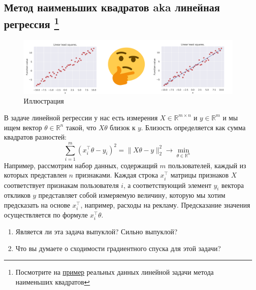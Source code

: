 \documentclass[
  russian,
  letterpaper,
  DIV=11,
  numbers=noendperiod]{scrartcl}
\providecommand{\tightlist}{%
  \setlength{\itemsep}{0pt}\setlength{\parskip}{0pt}}
\begin{document}
\subsection[Метод наименьших квадратов aka линейная регрессия
]{\texorpdfstring{Метод наименьших квадратов aka линейная регрессия
\footnote{Посмотрите на
  \href{https://colab.research.google.com/github/MerkulovDaniil/optim/blob/master/assets/Notebooks/Real_world_LLS_exercise.ipynb}{\faPython пример}
  реальных данных линейной задачи метода наименьших квадратов}}{Метод наименьших квадратов aka линейная регрессия }}\label{ux43cux435ux442ux43eux434-ux43dux430ux438ux43cux435ux43dux44cux448ux438ux445-ux43aux432ux430ux434ux440ux430ux442ux43eux432-aka-ux43bux438ux43dux435ux439ux43dux430ux44f-ux440ux435ux433ux440ux435ux441ux441ux438ux44f}

\begin{figure}[H]

{\centering \includegraphics[width=0.75\linewidth,height=\textheight,keepaspectratio]{lls_idea.pdf}

}

\caption{Иллюстрация}

\end{figure}%

В задаче линейной регрессии у нас есть измерения
\(X \in \mathbb{R}^{m \times n}\) и \(y \in \mathbb{R}^{m}\) и мы ищем
вектор \(\theta \in \mathbb{R}^{n}\) такой, что \(X \theta\) близок к
\(y\). Близость определяется как сумма квадратов разностей: \[ 
\sum\limits_{i=1}^m (x_i^\top \theta - y_i)^2 = \|X \theta - y\|^2_2 \to \min_{\theta \in \mathbb{R}^{n}}
\] Например, рассмотрим набор данных, содержащий \(m\) пользователей,
каждый из которых представлен \(n\) признаками. Каждая строка
\(x_i^\top\) матрицы признаков \(X\) соответствует признакам
пользователя \(i\), а соответствующий элемент \(y_i\) вектора откликов
\(y\) представляет собой измеряемую величину, которую мы хотим
предсказать на основе \(x_i^\top\), например, расходы на рекламу.
Предсказание значения осуществляется по формуле \(x_i^\top \theta\).

\begin{enumerate}
\def\labelenumi{\arabic{enumi}.}
\tightlist
\item
  Является ли эта задача выпуклой? Сильно выпуклой?
\item
  Что вы думаете о сходимости градиентного спуска для этой задачи?
\end{enumerate}
\end{document}
